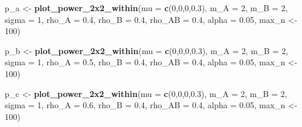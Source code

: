 \documentclass[]{article}
\newenvironment{Shaded}{\begin{snugshade}}{\end{snugshade}}
\newcommand{\KeywordTok}[1]{\textcolor[rgb]{0.13,0.29,0.53}{\textbf{#1}}}
\newcommand{\DataTypeTok}[1]{\textcolor[rgb]{0.13,0.29,0.53}{#1}}
\newcommand{\DecValTok}[1]{\textcolor[rgb]{0.00,0.00,0.81}{#1}}
\newcommand{\FloatTok}[1]{\textcolor[rgb]{0.00,0.00,0.81}{#1}}
\newcommand{\StringTok}[1]{\textcolor[rgb]{0.31,0.60,0.02}{#1}}
\newcommand{\NormalTok}[1]{#1}
\begin{document}
\begin{Shaded}
\begin{Highlighting}[]
\NormalTok{p_a <-}\StringTok{ }\KeywordTok{plot_power_2x2_within}\NormalTok{(}\DataTypeTok{mu =} \KeywordTok{c}\NormalTok{(}\DecValTok{0}\NormalTok{,}\DecValTok{0}\NormalTok{,}\DecValTok{0}\NormalTok{,}\FloatTok{0.3}\NormalTok{), }
                      \DataTypeTok{m_A =} \DecValTok{2}\NormalTok{, }
                      \DataTypeTok{m_B =} \DecValTok{2}\NormalTok{, }
                      \DataTypeTok{sigma =} \DecValTok{1}\NormalTok{, }
                      \DataTypeTok{rho_A =} \FloatTok{0.4}\NormalTok{, }
                      \DataTypeTok{rho_B =} \FloatTok{0.4}\NormalTok{, }
                      \DataTypeTok{rho_AB =} \FloatTok{0.4}\NormalTok{, }
                      \DataTypeTok{alpha =} \FloatTok{0.05}\NormalTok{,}
\NormalTok{                      max_n <-}\StringTok{ }\DecValTok{100}\NormalTok{)}

\NormalTok{p_b <-}\StringTok{ }\KeywordTok{plot_power_2x2_within}\NormalTok{(}\DataTypeTok{mu =} \KeywordTok{c}\NormalTok{(}\DecValTok{0}\NormalTok{,}\DecValTok{0}\NormalTok{,}\DecValTok{0}\NormalTok{,}\FloatTok{0.3}\NormalTok{), }
                      \DataTypeTok{m_A =} \DecValTok{2}\NormalTok{, }
                      \DataTypeTok{m_B =} \DecValTok{2}\NormalTok{, }
                      \DataTypeTok{sigma =} \DecValTok{1}\NormalTok{, }
                      \DataTypeTok{rho_A =} \FloatTok{0.5}\NormalTok{, }
                      \DataTypeTok{rho_B =} \FloatTok{0.4}\NormalTok{, }
                      \DataTypeTok{rho_AB =} \FloatTok{0.4}\NormalTok{, }
                      \DataTypeTok{alpha =} \FloatTok{0.05}\NormalTok{,}
\NormalTok{                      max_n <-}\StringTok{ }\DecValTok{100}\NormalTok{)}

\NormalTok{p_c <-}\StringTok{ }\KeywordTok{plot_power_2x2_within}\NormalTok{(}\DataTypeTok{mu =} \KeywordTok{c}\NormalTok{(}\DecValTok{0}\NormalTok{,}\DecValTok{0}\NormalTok{,}\DecValTok{0}\NormalTok{,}\FloatTok{0.3}\NormalTok{), }
                      \DataTypeTok{m_A =} \DecValTok{2}\NormalTok{, }
                      \DataTypeTok{m_B =} \DecValTok{2}\NormalTok{, }
                      \DataTypeTok{sigma =} \DecValTok{1}\NormalTok{, }
                      \DataTypeTok{rho_A =} \FloatTok{0.6}\NormalTok{, }
                      \DataTypeTok{rho_B =} \FloatTok{0.4}\NormalTok{, }
                      \DataTypeTok{rho_AB =} \FloatTok{0.4}\NormalTok{, }
                      \DataTypeTok{alpha =} \FloatTok{0.05}\NormalTok{,}
\NormalTok{                      max_n <-}\StringTok{ }\DecValTok{100}\NormalTok{)}


\end{Highlighting}
\end{Shaded}
\end{document}
